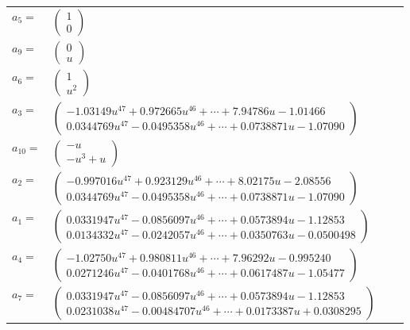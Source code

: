 \documentclass[1p]{elsarticle_modified}
\theoremstyle{definition}
\begin{document}
\begin{tabular}{m{7pt} m{180pt} m{7pt} m{180pt} }
\flushright $a_{5}=$&$\begin{pmatrix}1\\0\end{pmatrix}$ \\
\flushright $a_{9}=$&$\begin{pmatrix}0\\u\end{pmatrix}$ \\
\flushright $a_{6}=$&$\begin{pmatrix}1\\u^2\end{pmatrix}$ \\
\flushright $a_{3}=$&$\begin{pmatrix}-1.03149 u^{47}+0.972665 u^{46}+\cdots+7.94786 u-1.01466\\0.0344769 u^{47}-0.0495358 u^{46}+\cdots+0.0738871 u-1.07090\end{pmatrix}$ \\
\flushright $a_{10}=$&$\begin{pmatrix}- u\\- u^3+u\end{pmatrix}$ \\
\flushright $a_{2}=$&$\begin{pmatrix}-0.997016 u^{47}+0.923129 u^{46}+\cdots+8.02175 u-2.08556\\0.0344769 u^{47}-0.0495358 u^{46}+\cdots+0.0738871 u-1.07090\end{pmatrix}$ \\
\flushright $a_{1}=$&$\begin{pmatrix}0.0331947 u^{47}-0.0856097 u^{46}+\cdots+0.0573894 u-1.12853\\0.0134332 u^{47}-0.0242057 u^{46}+\cdots+0.0350763 u-0.0500498\end{pmatrix}$ \\
\flushright $a_{4}=$&$\begin{pmatrix}-1.02750 u^{47}+0.980811 u^{46}+\cdots+7.96292 u-0.995240\\0.0271246 u^{47}-0.0401768 u^{46}+\cdots+0.0617487 u-1.05477\end{pmatrix}$ \\
\flushright $a_{7}=$&$\begin{pmatrix}0.0331947 u^{47}-0.0856097 u^{46}+\cdots+0.0573894 u-1.12853\\0.0231038 u^{47}-0.00484707 u^{46}+\cdots+0.0173387 u+0.0308295\end{pmatrix}$ \\

\end{tabular}
\end{document}
